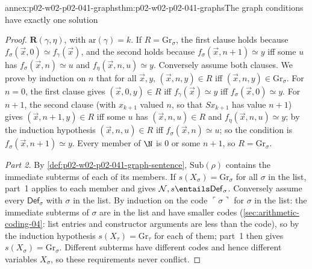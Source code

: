 \begin{annexitem}{annex:p02-w02-p02-041-graphs}{thm:p02-w02-p02-041-graphs}{The graph conditions have exactly one solution}
\begin{proof}
\(\mathbf R(\gamma,\eta)\), with \(\mathrm{ar}(\gamma)=k\).  If
\(R=\mathrm{Gr}_\sigma\), the first clause holds because
\(f_\sigma(\vec x,0)\simeq f_\gamma(\vec x)\), and the second holds because
\(f_\sigma(\vec x,n+1)\simeq y\) iff some \(u\) has
\(f_\sigma(\vec x,n)\simeq u\) and \(f_\eta(\vec x,n,u)\simeq y\).  Conversely
assume both clauses.  We prove by induction on \(n\) that for all \(\vec x,y\),
\((\vec x,n,y)\in R\) iff \((\vec x,n,y)\in\mathrm{Gr}_\sigma\).  For
\(n=0\), the first clause gives \((\vec x,0,y)\in R\) iff
\(f_\gamma(\vec x)\simeq y\) iff \(f_\sigma(\vec x,0)\simeq y\).  For \(n+1\),
the second clause (with \(x_{k+1}\) valued \(n\), so that \(Sx_{k+1}\) has value
\(n+1\)) gives \((\vec x,n+1,y)\in R\) iff some \(u\) has
\((\vec x,n,u)\in R\) and \(f_\eta(\vec x,n,u)\simeq y\); by the induction
hypothesis \((\vec x,n,u)\in R\) iff \(f_\sigma(\vec x,n)\simeq u\); so the
condition is \(f_\sigma(\vec x,n+1)\simeq y\).  Every member of \(\N\) is
\(0\) or some \(n+1\), so \(R=\mathrm{Gr}_\sigma\).

\emph{Part 2.}  By \cref{def:p02-w02-p02-041-graph-sentence},
\(\mathrm{Sub}(\rho)\) contains the immediate subterms of each of its members.
If \(s(X_\sigma)=\mathrm{Gr}_\sigma\) for all \(\sigma\) in the list, part~1
applies to each member and gives \(\mathcal N,s\entails\mathsf{Def}_\sigma\).
Conversely assume every \(\mathsf{Def}_\sigma\) with \(\sigma\) in the list.
By induction on the code \(\ulcorner\sigma\urcorner\) for \(\sigma\) in the
list: the immediate subterms of \(\sigma\) are in the list and have smaller
codes (\cref{sec:arithmetic-coding-04}: list entries and constructor arguments
are less than the code), so by the induction hypothesis
\(s(X_\tau)=\mathrm{Gr}_\tau\) for each of them; part~1 then gives
\(s(X_\sigma)=\mathrm{Gr}_\sigma\).  Different subterms have different codes and
hence different variables \(X_\sigma\), so these requirements never conflict.
\end{proof}
\end{annexitem}

